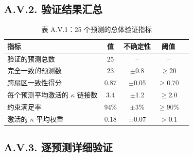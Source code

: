 \documentclass[11pt,a4paper]{article}
\begin{document}
	\subsection*{A.V.2. 验证结果汇总}
	
	\begin{table}[H]
		\centering
		\small
		\caption{表 A.V.1：25 个预测的总体验证指标}
		\begin{tabular}{p{}cccc}
			\toprule
			\textbf{指标} & \textbf{值} & \textbf{不确定性} & \textbf{阈值} \\
			\midrule
			验证的预测总数 & 25 & -- & -- \\
			完全一致的预测数 & 23 & $\pm$0.8 & $\geq$20 \\
			跨扇区一致性得分 & 0.87 & $\pm$0.05 & $\geq$0.70 \\
			每个预测平均激活的 $\kappa$ 链接数 & 3.4 & $\pm$1.2 & $\geq$2.0 \\
			约束满足率 & 94\% & $\pm$3\% & $\geq$90\% \\
			激活的 $\kappa$ 平均权重 & 0.18 & $\pm$0.07 & $>0.1$ \\
			\bottomrule
		\end{tabular}
		\label{tab:validation-summary}
	\end{table}
	
	\subsection*{A.V.3. 逐预测详细验证}
	
\end{document}
